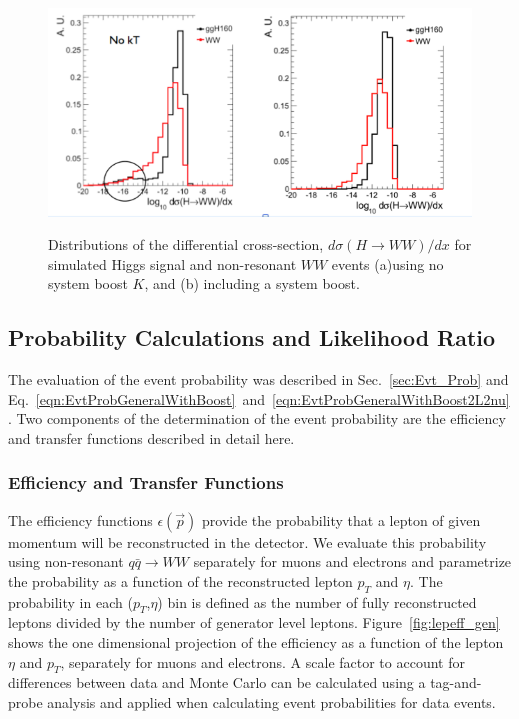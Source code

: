 \documentclass{cmspaper}
\begin{document}
\begin{figure}[!hbtp]                                                                                         
\centering                                                                                                                                             
\includegraphics[width=.84\textwidth]{figures/SystemBoostEffect.png}\\                                            
\caption{
Distributions of the differential cross-section, $d\sigma(H \rightarrow WW)/dx$ for simulated Higgs signal and non-resonant $WW$ events
(a)using no system boost $K$, and (b) including a system boost.}
\label{fig:kteffect}                                                                                          
\end{figure}          

\subsection{Probability Calculations and Likelihood Ratio}
\label{sec:Probability}
The evaluation of the event probability was described in Sec.~\ref{sec:Evt_Prob} and 
Eq.~\ref{eqn:EvtProbGeneralWithBoost}~and~\ref{eqn:EvtProbGeneralWithBoost2L2nu}.
Two components of the determination of the event probability are the efficiency
and transfer functions described in detail here.

\subsubsection{Efficiency and Transfer Functions}
\label{sec:EfficiencyTransfer}
The efficiency functions $\epsilon(\vec{p})$ provide the probability that a lepton of given momentum
will be reconstructed in the detector. We evaluate this probability using non-resonant $q\bar{q}\rightarrow WW$
separately for muons and electrons and parametrize the probability as a function of the reconstructed
lepton $p_{T}$ and $\eta$.
The probability in each ($p_{T}$,$\eta$) bin is defined as the number of fully reconstructed leptons divided 
by the number of generator level leptons. Figure~\ref{fig:lepeff_gen} shows the 
one dimensional projection of the efficiency as a function of the lepton $\eta$ and $p_{T}$, separately for
muons and electrons. 
A scale factor to account for differences between 
data and Monte Carlo can be calculated using a tag-and-probe analysis and applied when calculating event 
probabilities for data events.
\end{document}
